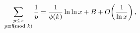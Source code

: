 \[\sum_{\begin{subarray}{c}p\leq x\\
p\equiv h\!\!\!\!\!\pmod{k}\end{subarray}}\frac{1}{p}=\frac{1}{\mathop{\phi\/}%
\nolimits\!\left(k\right)}\mathop{\ln\/}\nolimits\mathop{\ln\/}\nolimits x+B+%
\mathop{O\/}\nolimits\!\left(\frac{1}{\mathop{\ln\/}\nolimits x}\right),\]